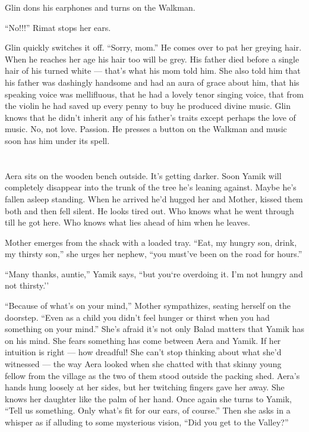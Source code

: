 \documentclass[twoside,11pt,openany]{book}
\begin{document}
Glin dons his earphones and turns on the Walkman.

``No!!!'' Rimat stops her ears.

Glin quickly
switches it off. ``Sorry, mom.'' He comes over to pat her greying
hair. When he reaches her age his hair too will be grey. His father died before a single hair of his turned white ---
that's what his mom told him.  She also told him that his father was dashingly handsome and had an
aura of grace about him, that his speaking voice was mellifluous, that he had a lovely tenor singing voice, that from
the violin he had saved up every penny to buy he produced divine music. Glin knows that
he didn't inherit any of his father's traits except perhaps the
love of music. No, not love. Passion. He presses a button on the
Walkman and music soon has him under its spell.

\chapter{}

{Aera sits on the wooden bench
out}side{. }It's getting darker.
Soon{ Yamik will completely disappear into the trunk of the tree he's
leaning against. Maybe he's fallen asleep standing. When he }arrived he'd hugged her and Mother, kissed them both
and then fell silent. He looks tired out. Who knows what he went through till he got here. Who knows what lies ahead of
him when he leaves.

Mother emerges from the shack with a loaded tray. {{}``Eat, my hungry
son, drink, my thirsty son,'' she urges her
}{nephew}{, ``you must've been on the road for
hours.''}

``Many thanks, auntie,'' Yamik says,
``but you`re overdoing it. I'm not hungry and
not thirsty.''

``Because of what's on your mind,'' Mother sympathizes, seating herself on the doorstep. ``Even as a child you
didn't feel hunger or thirst when you had something on your mind.''  She's afraid it's not only Balad matters that
Yamik has on his mind. She fears something has come between Aera and Yamik. If her intuition is right --- how dreadful!
She can't stop thinking about what she'd witnessed --- the way Aera looked when she chatted with that
skinny{ }young fellow from the village as the two of them stood outside the packing shed. Aera's
hands hung loosely at her sides, but her twitching fingers gave her away.  She knows her daughter like the palm of her
hand.  Once again she turns to Yamik, ``Tell us something. Only what's fit for our ears, of course.{}'' Then she asks
in a whisper as if alluding to some mysterious vision, ``Did you get to the Valley?''
\end{document}
